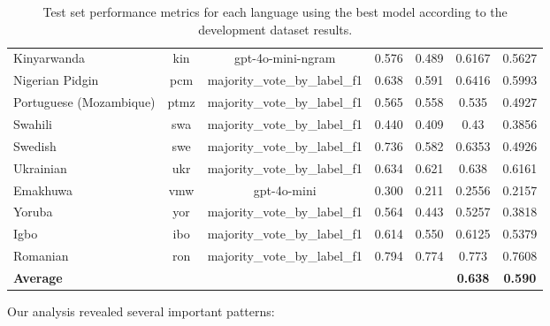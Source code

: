 \documentclass[a4paper,12pt]{extarticle}
\begin{document}
\begin{table}[th!]
{\begin{tabular}{@{}lcccccc@{}}
Kinyarwanda & kin & gpt-4o-mini-ngram & 0.576 & 0.489 & 0.6167 & 0.5627 \\
Nigerian Pidgin & pcm & majority\_vote\_by\_label\_f1 & 0.638 & 0.591 & 0.6416 & 0.5993 \\
Portuguese (Mozambique) & ptmz & majority\_vote\_by\_label\_f1 & 0.565 & 0.558 & 0.535 & 0.4927 \\
Swahili & swa & majority\_vote\_by\_label\_f1 & 0.440 & 0.409 & 0.43 & 0.3856 \\
Swedish & swe & majority\_vote\_by\_label\_f1 & 0.736 & 0.582 & 0.6353 & 0.4926 \\
Ukrainian & ukr & majority\_vote\_by\_label\_f1 & 0.634 & 0.621 & 0.638 & 0.6161 \\
Emakhuwa & vmw & gpt-4o-mini & 0.300 & 0.211 & 0.2556 & 0.2157 \\
Yoruba & yor & majority\_vote\_by\_label\_f1 & 0.564 & 0.443 & 0.5257 & 0.3818 \\
Igbo & ibo & majority\_vote\_by\_label\_f1 & 0.614 & 0.550 & 0.6125 & 0.5379 \\
Romanian & ron & majority\_vote\_by\_label\_f1 & 0.794 & 0.774 & 0.773 & 0.7608 \\ \midrule
\textbf{Average} & & & & & \textbf{0.638} & \textbf{0.590} \\ \bottomrule
\end{tabular}
}
\caption{Test set performance metrics for each language using the best model according to the development dataset results.}
\label{tab:test_metrics}
\end{table}


Our analysis revealed several important patterns:
\end{document}
